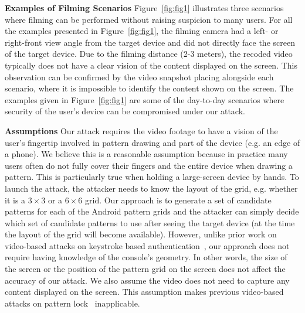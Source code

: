         \noindent \textbf{Examples of Filming Scenarios} Figure~\ref{fig:fig1} illustrates three scenarios where filming can be
        performed without raising suspicion to many users. For all the examples presented in Figure~\ref{fig:fig1}, the
        filming camera had a left- or right-front view angle from the target device and did not directly face the screen of the target device. Due to the filming distance (2-3 meters), the recoded video typically does not have a clear vision of
        the content displayed on the screen.  This observation can be confirmed by the video snapshot placing
        alongside each scenario, where it is impossible to identify the content shown on the screen.
        The examples given in Figure~\ref{fig:fig1} are some of the day-to-day
        scenarios where security of the user's device can be compromised under
        our attack.

        \noindent \textbf{Assumptions}
        Our attack requires the video footage to have a vision of the user's
        fingertip involved in pattern drawing and part of the device (e.g. an edge of a phone).
        We believe this is a reasonable assumption because in practice many users often do not fully cover their fingers and the entire device when drawing a pattern.
        This is particularly true when holding a large-screen device by hands.
        To launch the
        attack, the attacker needs to know the layout of the grid, e.g. whether it is
        a $3 \times 3$ or a $6 \times 6$ grid. Our approach is to generate a set of
        candidate patterns for each of the Android pattern grids and the attacker can simply decide
        which set of candidate patterns to use after seeing the target device (at the time the
        layout of the grid will become available). However, unlike prior work on
        video-based attacks on keystroke based authentication~\cite{shukla2014beware}, our approach does not
        require having knowledge of the console's geometry. In other words, the size
        of the screen or the position of the pattern grid  on the screen does not
        affect the accuracy of our attack. We also assume the video does not need to
        capture any content displayed on the screen. This assumption makes previous
        video-based attacks on pattern lock~\cite{aviv2010smudge} inapplicable.
